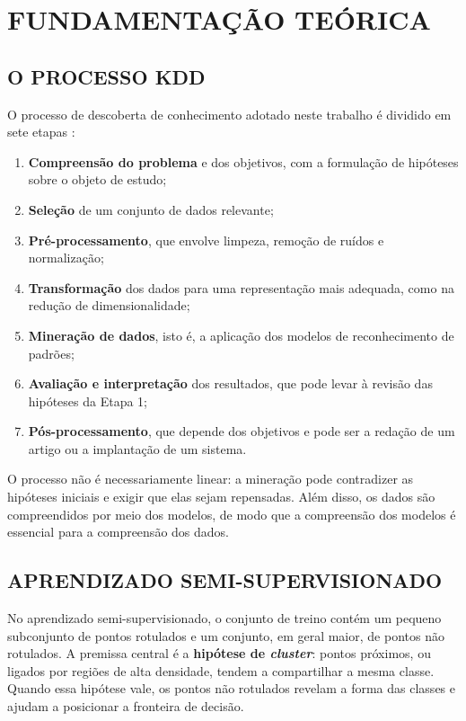 \chapter[Fundamentação Teórica]{FUNDAMENTAÇÃO TEÓRICA}

\section{O PROCESSO KDD}

O processo de descoberta de conhecimento adotado neste trabalho é dividido em sete etapas \citep{fayyad1996kdd, azevedo2008kdd}:

\begin{enumerate}
    \item \textbf{Compreensão do problema} e dos objetivos, com a formulação de hipóteses sobre o objeto de estudo;
    \item \textbf{Seleção} de um conjunto de dados relevante;
    \item \textbf{Pré-processamento}, que envolve limpeza, remoção de ruídos e normalização;
    \item \textbf{Transformação} dos dados para uma representação mais adequada, como na redução de dimensionalidade;
    \item \textbf{Mineração de dados}, isto é, a aplicação dos modelos de reconhecimento de padrões;
    \item \textbf{Avaliação e interpretação} dos resultados, que pode levar à revisão das hipóteses da Etapa 1;
    \item \textbf{Pós-processamento}, que depende dos objetivos e pode ser a redação de um artigo ou a implantação de um sistema.
\end{enumerate}

O processo não é necessariamente linear: a mineração pode contradizer as hipóteses iniciais e exigir que elas sejam repensadas. Além disso, os dados são compreendidos por meio dos modelos, de modo que a compreensão dos modelos é essencial para a compreensão dos dados.

\section{APRENDIZADO SEMI-SUPERVISIONADO}

No aprendizado semi-supervisionado, o conjunto de treino contém um pequeno subconjunto de pontos rotulados e um conjunto, em geral maior, de pontos não rotulados. A premissa central é a \textbf{hipótese de \textit{cluster}}: pontos próximos, ou ligados por regiões de alta densidade, tendem a compartilhar a mesma classe. Quando essa hipótese vale, os pontos não rotulados revelam a forma das classes e ajudam a posicionar a fronteira de decisão.

